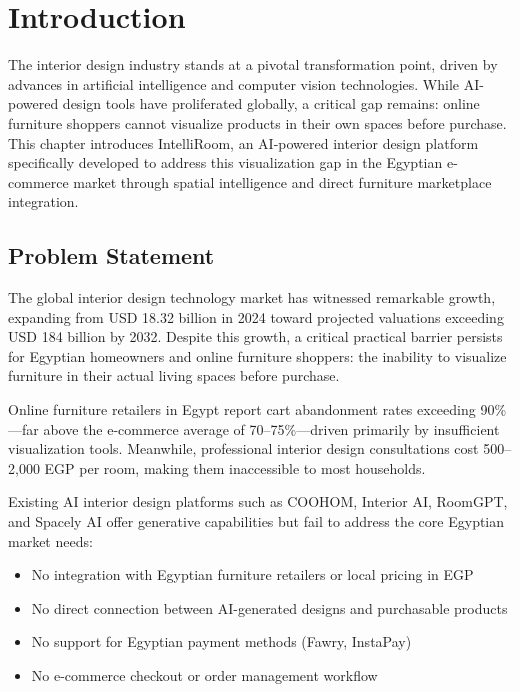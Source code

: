 
\chapter{Introduction}
\label{chap:introduction}

The interior design industry stands at a pivotal transformation point, driven by advances in artificial intelligence and computer vision technologies. While AI-powered design tools have proliferated globally, a critical gap remains: online furniture shoppers cannot visualize products in their own spaces before purchase. This chapter introduces IntelliRoom, an AI-powered interior design platform specifically developed to address this visualization gap in the Egyptian e-commerce market through spatial intelligence and direct furniture marketplace integration.

\section{Problem Statement}
\label{sec:problem_statement}

The global interior design technology market has witnessed remarkable growth, expanding from USD 18.32 billion in 2024 toward projected valuations exceeding USD 184 billion by 2032. Despite this growth, a critical practical barrier persists for Egyptian homeowners and online furniture shoppers: the inability to visualize furniture in their actual living spaces before purchase.

Online furniture retailers in Egypt report cart abandonment rates exceeding 90\%---far above the e-commerce average of 70--75\%---driven primarily by insufficient visualization tools. Meanwhile, professional interior design consultations cost 500--2,000 EGP per room, making them inaccessible to most households.

Existing AI interior design platforms such as COOHOM, Interior AI, RoomGPT, and Spacely AI offer generative capabilities but fail to address the core Egyptian market needs:

\begin{itemize}
    \item No integration with Egyptian furniture retailers or local pricing in EGP
    \item No direct connection between AI-generated designs and purchasable products
    \item No support for Egyptian payment methods (Fawry, InstaPay)
    \item No e-commerce checkout or order management workflow
\end{itemize}

